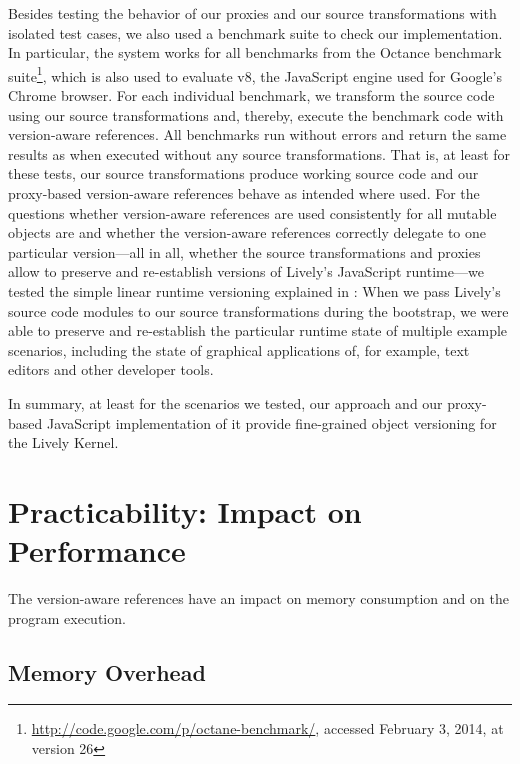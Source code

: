 Besides testing the behavior of our proxies and our source transformations with isolated test cases, we also used a benchmark suite to check our implementation.
In particular, the system works for all benchmarks from the Octance benchmark suite\footnote{\url{http://code.google.com/p/octane-benchmark/}, accessed February 3, 2014, at version 26}, which is also used to evaluate v8, the JavaScript engine used for Google's Chrome browser.
For each individual benchmark, we transform the source code using our source transformations and, thereby, execute the benchmark code with version-aware references.
All benchmarks run without errors and return the same results as when executed without any source transformations.
That is, at least for these tests, our source transformations produce working source code and our proxy-based version-aware references behave as intended where used.
For the questions whether version-aware references are used consistently for all mutable objects are and whether the version-aware references correctly delegate to one particular version---all in all, whether the source transformations and proxies allow to preserve and re-establish versions of Lively's JavaScript runtime---we tested the simple linear runtime versioning explained in :
When we pass Lively's source code modules to our source transformations during the bootstrap, we were able to preserve and re-establish the particular runtime state of multiple example scenarios, including the state of graphical applications of, for example, text editors and other developer tools.

In summary, at least for the scenarios we tested, our approach and our proxy-based JavaScript implementation of it provide fine-grained object versioning for the Lively Kernel.



\section{Practicability: Impact on Performance}

The version-aware references have an impact on memory consumption and on the program execution.

\subsection{Memory Overhead}

